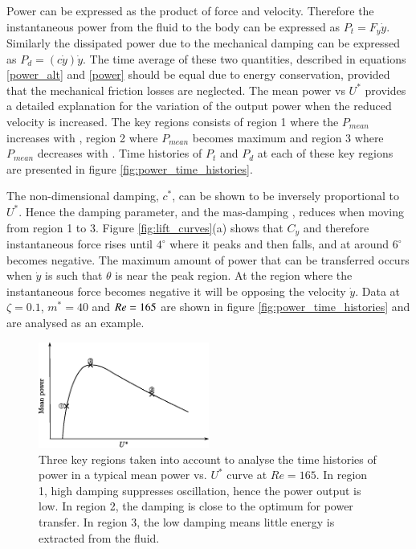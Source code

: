 
 


Power can be expressed as the product of force and velocity. Therefore the instantaneous power from the fluid to the body can be expressed as $P_t=F_y\dot{y}$. Similarly the dissipated power due to the mechanical damping can be expressed as $P_d=(c\dot{y})\dot{y}$. The time average of these two quantities, described in equations \ref{power_alt} and \ref{power} should be equal due to energy conservation, provided that the mechanical friction losses are neglected. The mean power vs $U^*$ provides a detailed explanation for the variation of the output power when the reduced velocity is increased. The key regions consists of region 1 where the $P_{mean}$ increases with \ustar, region 2 where $P_{mean}$ becomes maximum and region 3 where $P_{mean}$ decreases with \ustar. Time histories of $P_t $ and $P_d$ at each of these key regions are presented in figure \ref{fig:power_time_histories}.

The non-dimensional damping, $c^*$, can be shown to be inversely proportional to $U^*$. Hence the damping parameter, and the mas-damping \massdamp, reduces when moving from region 1 to 3. Figure \ref{fig:lift_curves}(a) shows that $C_y$ and therefore instantaneous force rises until $4^\circ$ where it peaks and then falls, and at around $6^\circ$ becomes negative. The maximum amount of power that can be transferred occurs when $\dot{y}$ is such that $\theta$ is near the peak region. At the region where the instantaneous force becomes negative it will be opposing the velocity $\dot{y}$. Data at $\zeta=0.1$, $m^*=40$ and $Re=165$ are shown in figure \ref{fig:power_time_histories} and are analysed as an example.

\begin{figure}[h!]
\centering
\includegraphics[width=0.5\textwidth]{../FnP/sketch_1}
\caption{ Three key regions taken into account to analyse the time histories of power in a typical mean power vs. $U^*$ curve at $Re=165$. In region 1, high damping suppresses oscillation, hence the power output is low. In region 2, the damping is close to the optimum for power transfer. In region 3, the low damping means little energy is extracted from the fluid.}
\label{fig:regions_1}
\end{figure}



